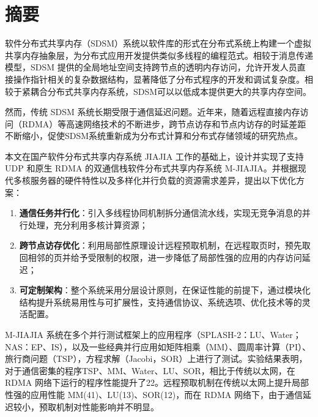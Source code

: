 
\maketitle%
\MAKETITLE%
\makedeclaration%
\intobmk\chapter*{摘\quad 要}%
\setcounter{page}{1}%
软件分布式共享内存（SDSM）系统以软件库的形式在分布式系统上构建一个虚拟共享内存抽象层，为分布式应用开发提供类似多线程的编程范式。相较于消息传递模型，SDSM 提供的全局地址空间支持跨节点的透明内存访问，允许开发人员直接操作指针相关的复杂数据结构，显著降低了分布式程序的开发和调试复杂度。相较于紧耦合分布式共享内存系统，SDSM可以以低成本提供更大的共享内存空间。

然而，传统 SDSM 系统长期受限于通信延迟问题。近年来，随着远程直接内存访问（RDMA）等高速网络技术的不断进步，跨节点访存和节点内访存的时延差距不断缩小，促使SDSM系统重新成为分布式计算和分布式存储领域的研究热点。

本文在国产软件分布式共享内存系统 JIAJIA 工作的基础上，设计并实现了支持 UDP 和原生 RDMA 的双通信栈软件分布式共享内存系统 M-JIAJIA。并根据现代多核服务器的硬件特性以及多样化并行负载的资源需求差异，提出以下优化方案：
\begin{enumerate}[label=\arabic*.]
    \item \textbf{通信任务并行化}：引入多线程协同机制拆分通信流水线，实现无竞争消息的并行处理，充分利用多核计算资源；
    \item \textbf{跨节点访存优化}：利用局部性原理设计远程预取机制，在远程取页时，预先取回相邻的页并给予受限制的权限，进一步降低了局部性强的应用的内存访问延迟；
    \item \textbf{可定制架构}：整个系统采用分层设计原则，在保证性能的前提下，通过模块化结构提升系统易用性与可扩展性，支持通信协议、系统选项、优化技术等的灵活配置。
\end{enumerate}

M-JIAJIA 系统在多个并行测试框架上的应用程序（SPLASH-2：LU、Water；NAS：EP、IS），以及一些经典并行应用如矩阵相乘（MM）、圆周率计算（PI）、旅行商问题（TSP），方程求解（Jacobi，SOR）上进行了测试。实验结果表明，对于通信密集的程序TSP、MM、Water、LU、SOR，相比于传统以太网，在RDMA 网络下运行的程序性能提升了22\times。远程预取机制在传统以太网上提升局部性强的应用性能 MM(41\times)、LU(13\times)、SOR(12\times)，而在 RDMA 网络下，由于通信延迟较小，预取机制对性能影响并不明显。


